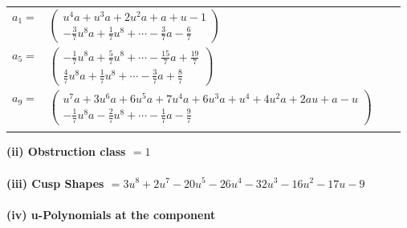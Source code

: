 \documentclass[1p]{elsarticle_modified}
\theoremstyle{definition}
\begin{document}
\begin{tabular}{m{7pt} m{180pt} m{7pt} m{180pt} }
\flushright $a_{1}=$&$\begin{pmatrix}u^4 a+u^3 a+2 u^2 a+a+u-1\\-\frac{3}{7} u^8 a+\frac{1}{7} u^8+\cdots-\frac{3}{7} a-\frac{6}{7}\end{pmatrix}$ \\
\flushright $a_{5}=$&$\begin{pmatrix}-\frac{1}{7} u^8 a+\frac{5}{7} u^8+\cdots-\frac{15}{7} a+\frac{19}{7}\\\frac{4}{7} u^8 a+\frac{1}{7} u^8+\cdots-\frac{3}{7} a+\frac{8}{7}\end{pmatrix}$ \\
\flushright $a_{9}=$&$\begin{pmatrix}u^7 a+3 u^6 a+6 u^5 a+7 u^4 a+6 u^3 a+u^4+4 u^2 a+2 a u+a- u\\-\frac{1}{7} u^8 a-\frac{2}{7} u^8+\cdots-\frac{1}{7} a-\frac{9}{7}\end{pmatrix}$\\&\end{tabular}
\flushleft \textbf{(ii) Obstruction class $= 1$}\\~\\
\flushleft \textbf{(iii) Cusp Shapes $= 3 u^8+2 u^7-20 u^5-26 u^4-32 u^3-16 u^2-17 u-9$}\\~\\
\newpage\renewcommand{\arraystretch}{1}
\flushleft \textbf{(iv) u-Polynomials at the component}\newline \\
\end{document}
